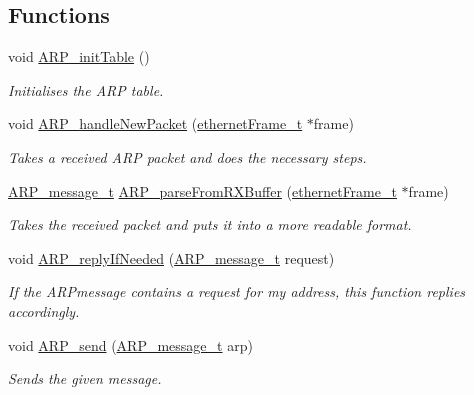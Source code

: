 \subsection*{Functions}
\begin{DoxyCompactItemize}
\item 
void \mbox{\hyperlink{group__arp_ga35f276b970aa00ca18990c7ddc63a65e}{A\+R\+P\+\_\+init\+Table}} ()
\begin{DoxyCompactList}\small\item\em Initialises the A\+RP table. \end{DoxyCompactList}\item 
void \mbox{\hyperlink{group__arp_ga1ba858e52bf34bca0e5260f0dc0e4641}{A\+R\+P\+\_\+handle\+New\+Packet}} (\mbox{\hyperlink{group__ethernet_ga7519a7ae14b490659069435698d28a25}{ethernet\+Frame\+\_\+t}} $\ast$frame)
\begin{DoxyCompactList}\small\item\em Takes a received A\+RP packet and does the necessary steps. \end{DoxyCompactList}\item 
\mbox{\hyperlink{group__arp_ga1708785291f10e8cc257efe2b769ba4c}{A\+R\+P\+\_\+message\+\_\+t}} \mbox{\hyperlink{group__arp_gaa4326b29383563a2d0bae66883d2aeb6}{A\+R\+P\+\_\+parse\+From\+R\+X\+Buffer}} (\mbox{\hyperlink{group__ethernet_ga7519a7ae14b490659069435698d28a25}{ethernet\+Frame\+\_\+t}} $\ast$frame)
\begin{DoxyCompactList}\small\item\em Takes the received packet and puts it into a more readable format. \end{DoxyCompactList}\item 
void \mbox{\hyperlink{group__arp_gae3e5d52fa89b91d6552cb328b8b6ec81}{A\+R\+P\+\_\+reply\+If\+Needed}} (\mbox{\hyperlink{group__arp_ga1708785291f10e8cc257efe2b769ba4c}{A\+R\+P\+\_\+message\+\_\+t}} request)
\begin{DoxyCompactList}\small\item\em If the A\+R\+Pmessage contains a request for my address, this function replies accordingly. \end{DoxyCompactList}\item 
void \mbox{\hyperlink{group__arp_gabce5812c383f7e08c3a83c6db7f2f029}{A\+R\+P\+\_\+send}} (\mbox{\hyperlink{group__arp_ga1708785291f10e8cc257efe2b769ba4c}{A\+R\+P\+\_\+message\+\_\+t}} arp)
\begin{DoxyCompactList}\small\item\em Sends the given message. \end{DoxyCompactList}\item 

\end{DoxyCompactItemize}
